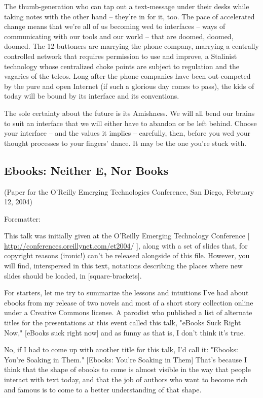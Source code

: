 The thumb-generation who can tap out a text-message under their
desks while taking notes with the other hand -- they're in for it,
too. The pace of accelerated change means that we're all of us
becoming wed to interfaces -- ways of communicating with our tools
and our world -- that are doomed, doomed, doomed. The 12-buttoners
are marrying the phone company, marrying a centrally controlled
network that requires permission to use and improve, a Stalinist
technology whose centralized choke points are subject to regulation
and the vagaries of the telcos. Long after the phone companies have
been out-competed by the pure and open Internet (if such a glorious
day comes to pass), the kids of today will be bound by its
interface and its conventions.

The sole certainty about the future is its Amishness. We will all
bend our brains to suit an interface that we will either have to
abandon or be left behind. Choose your interface -- and the values
it implies -- carefully, then, before you wed your thought
processes to your fingers' dance. It may be the one you're stuck
with.

\subsection{Ebooks: Neither E, Nor Books}

(Paper for the O'Reilly Emerging Technologies Conference, San
Diego, February 12, 2004)

Forematter:

This talk was initially given at the O'Reilly Emerging Technology
Conference [
\href{http://conferences.oreillynet.com/et2004}{http://conferences.oreillynet.com/et2004}/
], along with a set of slides that, for copyright reasons (ironic!)
can't be released alongside of this file. However, you will find,
interspersed in this text, notations describing the places where
new slides should be loaded, in [square-brackets].

For starters, let me try to summarize the lessons and intuitions
I've had about ebooks from my release of two novels and most of a
short story collection online under a Creative Commons license. A
parodist who published a list of alternate titles for the
presentations at this event called this talk, "eBooks Suck Right
Now," [eBooks suck right now] and as funny as that is, I don't
think it's true.

No, if I had to come up with another title for this talk, I'd call
it: "Ebooks: You're Soaking in Them." [Ebooks: You're Soaking in
Them] That's because I think that the shape of ebooks to come is
almost visible in the way that people interact with text today, and
that the job of authors who want to become rich and famous is to
come to a better understanding of that shape.

